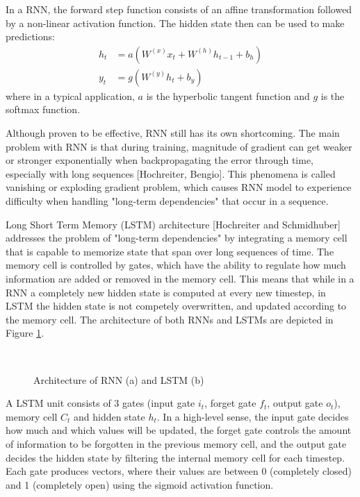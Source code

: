 \documentclass[12pt]{extarticle}
\begin{document}
In a RNN, the forward step function consists of an affine transformation followed by a non-linear activation function. The hidden state then can be used to make predictions:
\begin{align}
h_{t} &= a(W^{(x)}x_{t} + W^{(h)}h_{t-1} + b_{h})\\
y_{t} &= g(W^{(y)}h_{t} + b_{y}) 
\end{align}
where in a typical application, $a$ is the hyperbolic tangent function and $g$ is the softmax function.

Although proven to be effective, RNN still has its own shortcoming. The main problem with RNN is that during training, magnitude of gradient can get weaker or stronger exponentially when backpropagating the error through time, especially with long sequences [Hochreiter, Bengio]. This phenomena is called vanishing or exploding gradient problem, which causes RNN model to experience difficulty when handling "long-term dependencies" that occur in a sequence.

Long Short Term Memory (LSTM) architecture [Hochreiter and Schmidhuber] addresses the problem of "long-term dependencies" by integrating a memory cell that is capable to memorize state that span over long sequences of time. The memory cell is controlled by gates, which have the ability to regulate how much information are added or removed in the memory cell. This means that while in a RNN a completely new hidden state is computed at every new timestep, in LSTM the hidden state is not competely overwritten, and updated according to the memory cell. The architecture of both RNNs and LSTMs are depicted in Figure \ref{fig:rnn}.
\begin{figure}[ht]
\centering
{} \\

\caption{Architecture of RNN (a) and LSTM (b)}
\label{fig:rnn}
\end{figure}

A LSTM unit consists of 3 gates (input gate $i_{t}$, forget gate $f_{t}$, output gate $o_{t}$), memory cell $C_{t}$ and hidden state $h_{t}$. In a high-level sense, the input gate decides how much and which values will be updated, the forget gate controls the amount of information to be forgotten in the previous memory cell, and the output gate decides the hidden state by filtering the internal memory cell for each timestep. Each gate produces vectors, where their values are between 0 (completely closed) and 1 (completely open) using the sigmoid activation function. 
\end{document}
